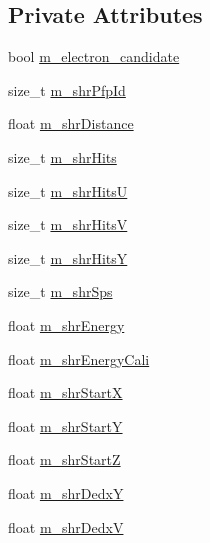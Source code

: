 \subsection*{Private Attributes}
\begin{DoxyCompactItemize}
\item 
bool \hyperlink{classselection_1_1CCincSelection_a61b7a5e571eac85c8171a3dbd6ab57c6}{m\-\_\-electron\-\_\-candidate}
\item 
size\-\_\-t \hyperlink{classselection_1_1CCincSelection_ad792c1259135d226df875d1150776ce9}{m\-\_\-shr\-Pfp\-Id}
\item 
float \hyperlink{classselection_1_1CCincSelection_ae496cb17c72b3ed96b13484a1ff9e3fb}{m\-\_\-shr\-Distance}
\item 
size\-\_\-t \hyperlink{classselection_1_1CCincSelection_ade863b5fa6560fed9dada486fa3469d6}{m\-\_\-shr\-Hits}
\item 
size\-\_\-t \hyperlink{classselection_1_1CCincSelection_a48423013d7f54f8b67c194534507f643}{m\-\_\-shr\-Hits\-U}
\item 
size\-\_\-t \hyperlink{classselection_1_1CCincSelection_a41998992412570fd00dc4e2457525b58}{m\-\_\-shr\-Hits\-V}
\item 
size\-\_\-t \hyperlink{classselection_1_1CCincSelection_aebe42543b0965cce015eb2a8412c33d4}{m\-\_\-shr\-Hits\-Y}
\item 
size\-\_\-t \hyperlink{classselection_1_1CCincSelection_a4694bec595cce8e01abc186d9c34e079}{m\-\_\-shr\-Sps}
\item 
float \hyperlink{classselection_1_1CCincSelection_a2650ff351a7a6589c2b6ff9f701da321}{m\-\_\-shr\-Energy}
\item 
float \hyperlink{classselection_1_1CCincSelection_adec1b19741776f6e33a88b4d0f2b6330}{m\-\_\-shr\-Energy\-Cali}
\item 
float \hyperlink{classselection_1_1CCincSelection_a692099d6cabdf30bfd269f35c3193971}{m\-\_\-shr\-Start\-X}
\item 
float \hyperlink{classselection_1_1CCincSelection_a60b711d11ef5b1ce99992df868e900c7}{m\-\_\-shr\-Start\-Y}
\item 
float \hyperlink{classselection_1_1CCincSelection_ac97b3d4c8f1dff8f692de9fc2c9f585c}{m\-\_\-shr\-Start\-Z}
\item 
float \hyperlink{classselection_1_1CCincSelection_aca70f9a6dfad2d0ed4c2ef4c71fe37bd}{m\-\_\-shr\-Dedx\-Y}
\item 
float \hyperlink{classselection_1_1CCincSelection_a2d1f501922cf14e3d1f6fb8cc8e63173}{m\-\_\-shr\-Dedx\-V}

\end{DoxyCompactItemize}
